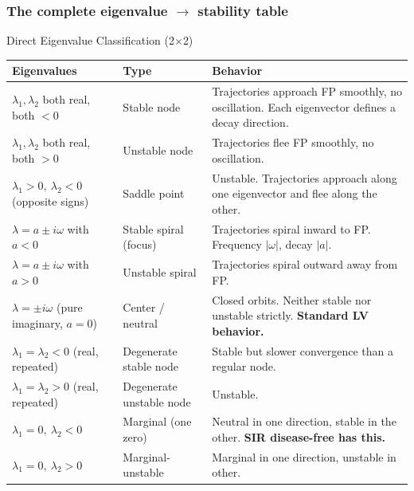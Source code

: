 \documentclass[11pt]{article}
\begin{document}
\subsubsection{The complete eigenvalue $\to$ stability table}

\begin{summarybox}{Direct Eigenvalue Classification (2$\times$2)}
\renewcommand{\arraystretch}{1.5}
\begin{tabular}{p{4.5cm}p{3.5cm}p{6cm}}
\toprule
\textbf{Eigenvalues} & \textbf{Type} & \textbf{Behavior}\\
\midrule
$\lambda_1, \lambda_2$ both real, both $< 0$ & Stable node & Trajectories approach FP smoothly, no oscillation. Each eigenvector defines a decay direction.\\
$\lambda_1, \lambda_2$ both real, both $> 0$ & Unstable node & Trajectories flee FP smoothly, no oscillation.\\
$\lambda_1 > 0,\ \lambda_2 < 0$ (opposite signs) & Saddle point & Unstable. Trajectories approach along one eigenvector and flee along the other.\\
$\lambda = a \pm i\omega$ with $a < 0$ & Stable spiral (focus) & Trajectories spiral inward to FP. Frequency $|\omega|$, decay $|a|$.\\
$\lambda = a \pm i\omega$ with $a > 0$ & Unstable spiral & Trajectories spiral outward away from FP.\\
$\lambda = \pm i\omega$ (pure imaginary, $a=0$) & Center / neutral & Closed orbits. Neither stable nor unstable strictly. \textbf{Standard LV behavior.}\\
$\lambda_1 = \lambda_2 < 0$ (real, repeated) & Degenerate stable node & Stable but slower convergence than a regular node.\\
$\lambda_1 = \lambda_2 > 0$ (real, repeated) & Degenerate unstable node & Unstable.\\
$\lambda_1 = 0,\ \lambda_2 < 0$ & Marginal (one zero) & Neutral in one direction, stable in the other. \textbf{SIR disease-free has this.}\\
$\lambda_1 = 0,\ \lambda_2 > 0$ & Marginal-unstable & Marginal in one direction, unstable in other.\\
\bottomrule
\end{tabular}
\end{summarybox}
\end{document}

